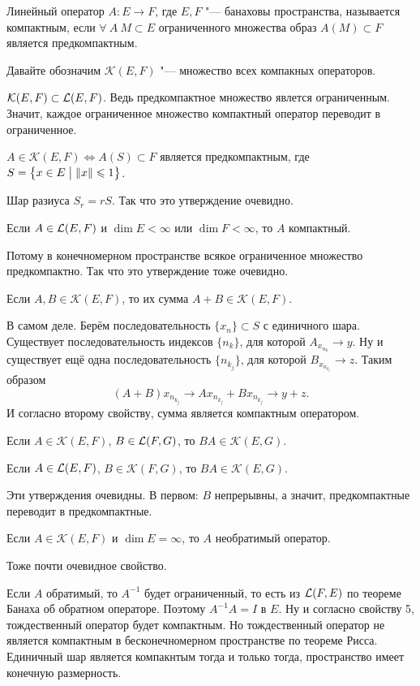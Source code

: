 \begin{Def}
  Линейный оператор $A\colon E\to F$, где $E,F$ "--- банаховы пространства, называется компактным, если $\forall\ A\ M\subset E$ ограниченного множества образ $A(M)\subset F$ является предкомпактным. 
\end{Def}
Давайте обозначим $\mathcal K(E,F)$ "--- множество всех компакных операторов.

\begin{Ut}
  $\mathcal K(E,F)\subset \L(E,F)$. Ведь предкомпактное множество явлется ограниченным. Значит, каждое ограниченное множество компактный оператор переводит в ограниченное.
\end{Ut}

\begin{Ut}
  $A\in\mathcal K(E,F)\iff A(S)\subset F$ является предкомпактным, где $S = \big\{x\in E\bigm|\|x\|\le1\big\}$.
\end{Ut}
Шар разиуса $S_r = r S$. Так что это утверждение очевидно.
\begin{Ut}
Если $A\in\L(E,F)$ и $\dim E<\infty$ или $\dim F<\infty$, то $A$ компактный.
\end{Ut}
Потому в конечномерном пространстве всякое ограниченное множество предкомпактно. Так что это утверждение тоже очевидно.

\begin{Ut}
  Если $A,B\in\mathcal K(E,F)$, то их сумма $A+B\in\mathcal K(E,F)$. 
\end{Ut}
\begin{Proof}
В самом деле. Берём последовательность $\{x_n\}\subset S$ с единичного шара. Существует последовательность индексов $\{n_k\}$, для которой $A_{x_{n_k}} \to y$. Ну и существует ещё одна последовательность $\{n_{k_j}\}$, для которой $B_{x_{n_{k_j}}}\to z$. Таким образом
\[
  (A+B)x_{n_{k_j}}\to A x_{n_{k_j}} + B{x_{n_{k_j}}}\to y + z.
\]
И согласно второму свойству, сумма является компактным оператором.
\end{Proof}

\begin{Ut}
  Если $A\in\mathcal K(E,F)$, $B\in\L(F,G)$, то $BA\in\mathcal K(E,G)$.
\end{Ut}
\begin{Ut}
  Если $A\in\L(E,F)$, $B\in\mathcal K(F,G)$, то $BA\in\mathcal K(E,G)$.
\end{Ut}
Эти утверждения очевидны. В первом: $B$ непрерывны, а значит, предкомпактные переводит в предкомпактные.

\begin{Ut}
  Если $A\in\mathcal K(E,F)$ и $\dim E = \infty$, то $A$ необратимый оператор.
\end{Ut}
Тоже почти очевидное свойство.
\begin{Proof}
Если $A$ обратимый, то $A^{-1}$ будет ограниченный, то есть из $\L(F,E)$ по теореме Банаха об обратном операторе. Поэтому $A^{-1}A = I$ в $E$. Ну и согласно свойству 5, тождественный оператор будет компактным. Но тождественный оператор не является компактным в бесконечномерном пространстве по теореме Рисса. Единичный шар является компакнтым тогда и только тогда, пространство имеет конечную размерность.
\end{Proof}

